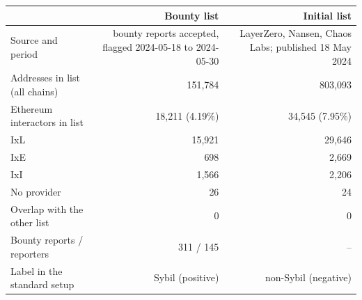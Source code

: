 \begin{tabular}{lrr}
\toprule
 & Bounty list & Initial list \\
\midrule
Source and period & bounty reports accepted, flagged 2024-05-18 to 2024-05-30 & LayerZero, Nansen, Chaos Labs; published 18 May 2024 \\
Addresses in list (all chains) & 151,784 & 803,093 \\
Ethereum interactors in list & 18,211 (4.19\%) & 34,545 (7.95\%) \\
\quad IxL & 15,921 & 29,646 \\
\quad IxE & 698 & 2,669 \\
\quad IxI & 1,566 & 2,206 \\
\quad No provider & 26 & 24 \\
Overlap with the other list & 0 & 0 \\
Bounty reports / reporters & 311 / 145 & -- \\
Label in the standard setup & Sybil (positive) & non-Sybil (negative) \\
\bottomrule
\end{tabular}
